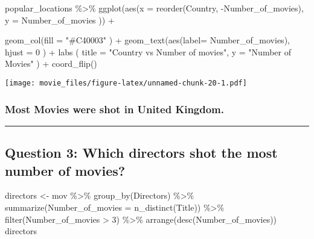\documentclass[
]{article}
\newenvironment{Shaded}{\begin{snugshade}}{\end{snugshade}}
\newcommand{\AttributeTok}[1]{\textcolor[rgb]{0.77,0.63,0.00}{#1}}
\newcommand{\DecValTok}[1]{\textcolor[rgb]{0.00,0.00,0.81}{#1}}
\newcommand{\FunctionTok}[1]{\textcolor[rgb]{0.00,0.00,0.00}{#1}}
\newcommand{\NormalTok}[1]{#1}
\newcommand{\OtherTok}[1]{\textcolor[rgb]{0.56,0.35,0.01}{#1}}
\newcommand{\SpecialCharTok}[1]{\textcolor[rgb]{0.00,0.00,0.00}{#1}}
\newcommand{\StringTok}[1]{\textcolor[rgb]{0.31,0.60,0.02}{#1}}
\begin{document}
\begin{Shaded}
\begin{Highlighting}[]
\NormalTok{popular\_locations }\SpecialCharTok{\%\textgreater{}\%}
\FunctionTok{ggplot}\NormalTok{(}\FunctionTok{aes}\NormalTok{(}\AttributeTok{x =} \FunctionTok{reorder}\NormalTok{(Country, }\SpecialCharTok{{-}}\NormalTok{Number\_of\_movies), }\AttributeTok{y =}\NormalTok{ Number\_of\_movies )) }\SpecialCharTok{+} 

\FunctionTok{geom\_col}\NormalTok{(}\AttributeTok{fill =} \StringTok{"\#C40003"}\NormalTok{ ) }\SpecialCharTok{+}
\FunctionTok{geom\_text}\NormalTok{(}\FunctionTok{aes}\NormalTok{(}\AttributeTok{label=}\NormalTok{ Number\_of\_movies), }\AttributeTok{hjust =} \DecValTok{0}\NormalTok{ ) }\SpecialCharTok{+}
\FunctionTok{labs}\NormalTok{ (}
  \AttributeTok{title =} \StringTok{"Country vs Number of movies"}\NormalTok{,}
  \AttributeTok{y =} \StringTok{"Number of Movies"}
\NormalTok{) }\SpecialCharTok{+}
\FunctionTok{coord\_flip}\NormalTok{()}
\end{Highlighting}
\end{Shaded}

\texttt{[image: movie\_files/figure-latex/unnamed-chunk-20-1.pdf]}

\hypertarget{most-movies-were-shot-in-united-kingdom.}{%
\subsubsection{\texorpdfstring{\textbf{Most Movies were shot in United
Kingdom.}}{Most Movies were shot in United Kingdom.}}\label{most-movies-were-shot-in-united-kingdom.}}

\begin{center}\rule{0.5\linewidth}{0.5pt}\end{center}

\hypertarget{q3}{%
\subsection{Question 3: Which directors shot the most number of
movies?}\label{q3}}

\begin{Shaded}
\begin{Highlighting}[]
\NormalTok{directors }\OtherTok{\textless{}{-}}\NormalTok{ mov }\SpecialCharTok{\%\textgreater{}\%}
\FunctionTok{group\_by}\NormalTok{(Directors) }\SpecialCharTok{\%\textgreater{}\%}
\FunctionTok{summarize}\NormalTok{(}\AttributeTok{Number\_of\_movies =} \FunctionTok{n\_distinct}\NormalTok{(Title)) }\SpecialCharTok{\%\textgreater{}\%}
\FunctionTok{filter}\NormalTok{(Number\_of\_movies }\SpecialCharTok{\textgreater{}} \DecValTok{3}\NormalTok{) }\SpecialCharTok{\%\textgreater{}\%}
\FunctionTok{arrange}\NormalTok{(}\FunctionTok{desc}\NormalTok{(Number\_of\_movies))}
\NormalTok{directors}
\end{Highlighting}
\end{Shaded}
\end{document}
